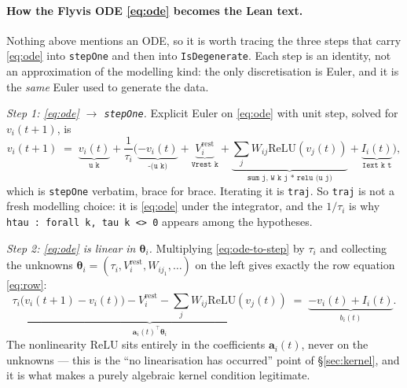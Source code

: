 \documentclass[11pt]{article}
\newcommand{\Mat}[1]{\mathbf{#1}}
\newcommand{\thet}{\boldsymbol{\theta}}
\begin{document}
\paragraph{How the Flyvis ODE \eqref{eq:ode} becomes the Lean text.} Nothing
above mentions an ODE, so it is worth tracing the three steps that carry
\eqref{eq:ode} into \texttt{stepOne} and then into \texttt{IsDegenerate}.
Each step is an identity, not an approximation of the modelling kind: the
only discretisation is Euler, and it is the \emph{same} Euler used to
generate the data.

\emph{Step 1: \eqref{eq:ode} $\to$ \texttt{stepOne}.} Explicit Euler on
\eqref{eq:ode} with unit step, solved for $v_i(t{+}1)$, is
\begin{equation}
v_i(t{+}1) \;=\; \underbrace{v_i(t)}_{\texttt{u k}}
  + \frac{1}{\tau_i}\Big(\underbrace{-v_i(t)}_{\texttt{-(u k)}}
  + \underbrace{V_i^{\mathrm{rest}}}_{\texttt{Vrest k}}
  + \underbrace{\textstyle\sum_j W_{ij}\mathrm{ReLU}(v_j(t))}_{\texttt{sum j, W k j * relu (u j)}}
  + \underbrace{I_i(t)}_{\texttt{Iext k t}}\Big),
\label{eq:ode-to-step}
\end{equation}
which is \texttt{stepOne} verbatim, brace for brace. Iterating it is
\texttt{traj}. So \texttt{traj} is not a fresh modelling choice: it is
\eqref{eq:ode} under the integrator, and the $1/\tau_i$ is why
\texttt{htau : forall k, tau k <> 0} appears among the hypotheses.

\emph{Step 2: \eqref{eq:ode} is linear in $\thet_i$.} Multiplying
\eqref{eq:ode-to-step} by $\tau_i$ and collecting the unknowns
$\thet_i=(\tau_i,V_i^{\mathrm{rest}},W_{ij_1},\dots)$ on the left gives
exactly the row equation \eqref{eq:row}:
\begin{equation}
\underbrace{\tau_i\big(v_i(t{+}1)-v_i(t)\big) - V_i^{\mathrm{rest}}
  - \textstyle\sum_j W_{ij}\mathrm{ReLU}(v_j(t))}_{\textstyle \Mat a_i(t)^{\!\top}\thet_i}
\;=\; \underbrace{-v_i(t)+I_i(t)}_{\textstyle b_i(t)} .
\label{eq:ode-to-row}
\end{equation}
The nonlinearity $\mathrm{ReLU}$ sits entirely in the coefficients $\Mat
a_i(t)$, never on the unknowns --- this is the ``no linearisation has
occurred'' point of \S\ref{sec:kernel}, and it is what makes a purely
algebraic kernel condition legitimate.
\end{document}
